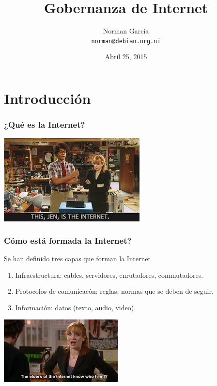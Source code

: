 \documentclass{beamer}
\title{Gobernanza de Internet}
\author[n0rman]{Norman Garc\'ia \\ \texttt{norman@debian.org.ni}}
\institute{Debian Nicaragua}
\date{Abril 25, 2015}
\begin{document}
\begin{frame}
	\titlepage
\end{frame}



\section{Introducci\'on}

\begin{frame}
\frametitle{¿Qu\'e es la Internet?}
	\begin{center}
		\includegraphics{../img/the-internet.jpeg}
	\end{center}
\end{frame}

\begin{frame}
\frametitle{C\'omo est\'a formada la Internet?}
	\pause Se han definido tres capas que forman la Internet
		\begin{enumerate}
			\pause \item \alert{Infraestructura}: cables, servidores, enrutadores, commutadores.
			\pause \item \alert{Protocolos de comunicac\'on}: reglas, normas que se deben de seguir.
			\pause \item \alert{Informaci\'on}: datos (texto, audio, video).
		\end{enumerate}
\end{frame}

\begin{frame}
	\begin{center}
	            \includegraphics[scale=0.90]{../img/the-elders-of-internet.jpg}
	\end{center}	
\end{frame}
\end{document}
